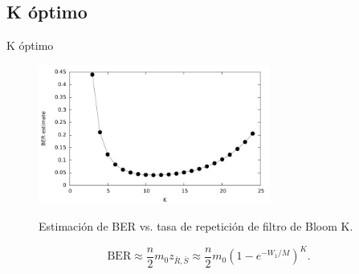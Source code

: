 \documentclass[aspectratio=169]{beamer}
\begin{document}
\subsection{K óptimo}

\begin{frame}{K óptimo}

\begin{figure}[!t]
  \centering
    \includegraphics[width=3in]{../graphs/Kcalc}
    
    Estimación de BER vs. tasa de repetición de filtro de Bloom K.
    \label{BERvsK}
\end{figure}

\begin{equation}
\text{BER} \approx \frac{n}{2} m_0 z_{\bar{R},\bar{S}} \approx \frac{n}{2} m_0 \left(1-e^{-W_1/M}\right)^K.
\end{equation}
\end{frame}


\end{document}

